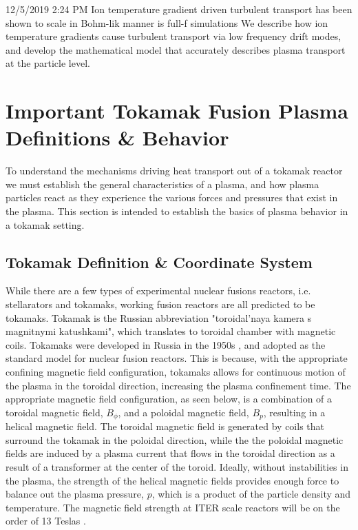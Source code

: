 \documentclass{article}
\begin{document}
12/5/2019 2:24 PM
Ion temperature gradient driven turbulent transport has been shown to scale in Bohm-lik manner is full-f simulations
We describe how ion temperature gradients cause turbulent transport via low frequency drift modes, and develop the mathematical model that accurately describes plasma transport at the particle level.




\section{Important Tokamak Fusion Plasma Definitions \& Behavior}
To understand the mechanisms driving heat transport out of a tokamak reactor we must establish the general characteristics of a plasma, and how plasma particles react as they experience the various forces and pressures that exist in the plasma. This section is intended to establish the basics of plasma behavior in a tokamak setting.



\subsection{Tokamak Definition \& Coordinate System}


While there are a few types of experimental nuclear fusions reactors, i.e. stellarators and tokamaks, working fusion reactors are all predicted to be tokamaks. Tokamak is the Russian abbreviation "toroidal'naya kamera s magnitnymi katushkami", which translates to toroidal chamber with magnetic coils. Tokamaks were developed in Russia in the 1950s \cite{Wesson}, and adopted as the standard model for nuclear fusion reactors. This is because, with the appropriate confining magnetic field configuration, tokamaks allows for continuous motion of the plasma in the toroidal direction, increasing the plasma confinement time. The appropriate magnetic field configuration, as seen below, is a combination of a toroidal magnetic field, $B_{\phi}$, and a poloidal magnetic field, $B_p$, resulting in a helical magnetic field. The toroidal magnetic field is generated by coils that surround the tokamak in the poloidal direction, while the the poloidal magnetic fields are induced by a plasma current that flows in the toroidal direction as a result of a transformer at the center of the toroid. Ideally, without instabilities in the plasma, the strength of the helical magnetic fields provides enough force to balance out the plasma pressure, $p$, which is a product of the particle density and temperature. The magnetic field strength at ITER scale reactors will be on the order of 13 Teslas \cite{ITER}. 
\end{document}
